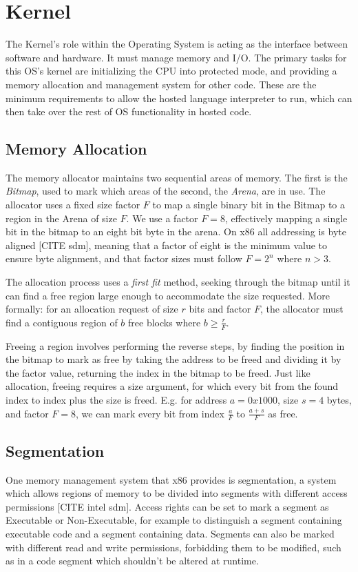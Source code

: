 \documentclass[11pt]{report}
\begin{document}
\section{Kernel}
The Kernel's role within the Operating System is acting as the interface between software and hardware. It must manage memory and I/O. The primary tasks for this OS's kernel are initializing the CPU into protected mode, and providing a memory allocation and management system for other code. These are the minimum requirements to allow the hosted language interpreter to run, which can then take over the rest of OS functionality in hosted code.

\subsection{Memory Allocation}
The memory allocator maintains two sequential areas of memory. The first is the \textit{Bitmap}, used to mark which areas of the second, the \textit{Arena}, are in use. The allocator uses a fixed size factor $F$ to map a single binary bit in the Bitmap to a region in the Arena of size $F$. We use a factor $F = 8$, effectively mapping a single bit in the bitmap to an eight bit byte in the arena. On x86 all addressing is byte aligned [CITE sdm], meaning that a factor of eight is the minimum value to ensure byte alignment, and that factor sizes must follow $F = 2^n$ where $n > 3 $.

The allocation process uses a \textit{first fit} method, seeking through the bitmap until it can find a free region large enough to accommodate the size requested. More formally: for an allocation request of size $r$ bits and factor $F$, the allocator must find a contiguous region of $b$ free blocks where $b \geq \frac{r}{F}$.

Freeing a region involves performing the reverse steps, by finding the position in the bitmap to mark as free by taking the address to be freed and dividing it by the factor value, returning the index in the bitmap to be freed. Just like allocation, freeing requires a size argument, for which every bit from the found index to index plus the size is freed. E.g. for address $a = 0x1000$, size $s = 4$ bytes, and factor $F = 8$, we can mark every bit from index $\frac{a}{F}$ to $\frac{a + s}{F}$ as free.

\subsection{Segmentation}
One memory management system that x86 provides is segmentation, a system which allows regions of memory to be divided into segments with different access permissions [CITE intel sdm]. Access rights can be set to mark a segment as Executable or Non-Executable, for example to distinguish a segment containing executable code and a segment containing data. Segments can also be marked with different read and write permissions, forbidding them to be modified, such as in a code segment which shouldn't be altered at runtime.
\end{document}
